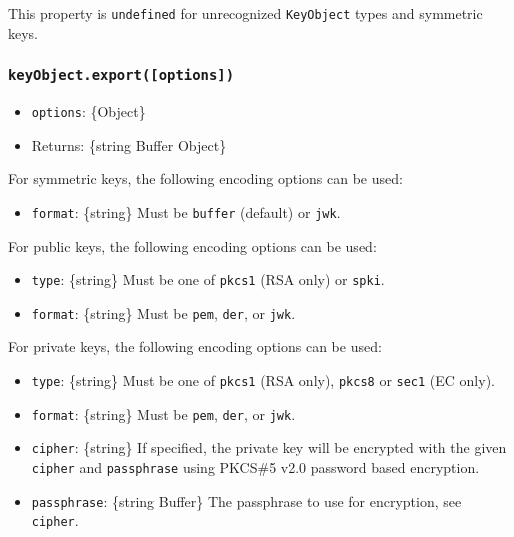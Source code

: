 This property is \texttt{undefined} for unrecognized \texttt{KeyObject}
types and symmetric keys.

\subsubsection{\texorpdfstring{\texttt{keyObject.export({[}options{]})}}{keyObject.export({[}options{]})}}\label{keyobject.exportoptions}

\begin{itemize}
\tightlist
\item
  \texttt{options}: \{Object\}
\item
  Returns: \{string \textbar{} Buffer \textbar{} Object\}
\end{itemize}

For symmetric keys, the following encoding options can be used:

\begin{itemize}
\tightlist
\item
  \texttt{format}: \{string\} Must be
  \texttt{\textquotesingle{}buffer\textquotesingle{}} (default) or
  \texttt{\textquotesingle{}jwk\textquotesingle{}}.
\end{itemize}

For public keys, the following encoding options can be used:

\begin{itemize}
\tightlist
\item
  \texttt{type}: \{string\} Must be one of
  \texttt{\textquotesingle{}pkcs1\textquotesingle{}} (RSA only) or
  \texttt{\textquotesingle{}spki\textquotesingle{}}.
\item
  \texttt{format}: \{string\} Must be
  \texttt{\textquotesingle{}pem\textquotesingle{}},
  \texttt{\textquotesingle{}der\textquotesingle{}}, or
  \texttt{\textquotesingle{}jwk\textquotesingle{}}.
\end{itemize}

For private keys, the following encoding options can be used:

\begin{itemize}
\tightlist
\item
  \texttt{type}: \{string\} Must be one of
  \texttt{\textquotesingle{}pkcs1\textquotesingle{}} (RSA only),
  \texttt{\textquotesingle{}pkcs8\textquotesingle{}} or
  \texttt{\textquotesingle{}sec1\textquotesingle{}} (EC only).
\item
  \texttt{format}: \{string\} Must be
  \texttt{\textquotesingle{}pem\textquotesingle{}},
  \texttt{\textquotesingle{}der\textquotesingle{}}, or
  \texttt{\textquotesingle{}jwk\textquotesingle{}}.
\item
  \texttt{cipher}: \{string\} If specified, the private key will be
  encrypted with the given \texttt{cipher} and \texttt{passphrase} using
  PKCS\#5 v2.0 password based encryption.
\item
  \texttt{passphrase}: \{string \textbar{} Buffer\} The passphrase to
  use for encryption, see \texttt{cipher}.
\end{itemize}

